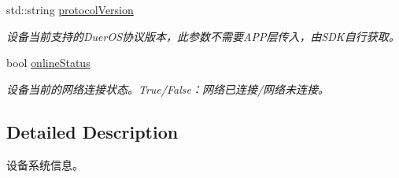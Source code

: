 \begin{DoxyCompactItemize}
\mbox{\label{structduerOSDcsSDK_1_1sdkInterfaces_1_1SystemInformation_a7a2868fa576db14d7974e083edebf6a4}} 
std\+::string \hyperlink{structduerOSDcsSDK_1_1sdkInterfaces_1_1SystemInformation_a7a2868fa576db14d7974e083edebf6a4}{protocol\+Version}
\begin{DoxyCompactList}\small\item\em 设备当前支持的\+Duer\+O\+S协议版本，此参数不需要\+A\+P\+P层传入，由\+S\+D\+K自行获取。 \end{DoxyCompactList}\item 
\mbox{\label{structduerOSDcsSDK_1_1sdkInterfaces_1_1SystemInformation_a44564c64df820891fde2623e37fa8957}} 
bool \hyperlink{structduerOSDcsSDK_1_1sdkInterfaces_1_1SystemInformation_a44564c64df820891fde2623e37fa8957}{online\+Status}
\begin{DoxyCompactList}\small\item\em 设备当前的网络连接状态。\+True/\+False：网络已连接/网络未连接。 \end{DoxyCompactList}\end{DoxyCompactItemize}


\subsection{Detailed Description}
设备系统信息。 